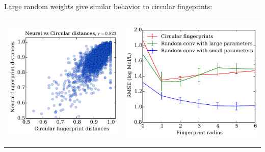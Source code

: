 \documentclass[landscape,a0b,final,a4resizeable]{include/a0poster}
\begin{document}
\begin{poster}
\begin{multicols}{3}
\newpage %



Large random weights give similar behavior to circular fingeprints:
\vspace{0.5em}

\begin{tabular}{cc}
\begin{minipage}[c]{0.48\columnwidth}
\includegraphics[width=\columnwidth]{figures/fig_2.pdf}
\end{minipage} & 
\begin{minipage}[c]{0.48\columnwidth}
\begin{center}
\vspace{0.5cm}\includegraphics[width=\columnwidth]{figures/fig_3.pdf}

\end{center}
\end{minipage}
\end{tabular}
\end{multicols}
\end{poster}
\end{document}
